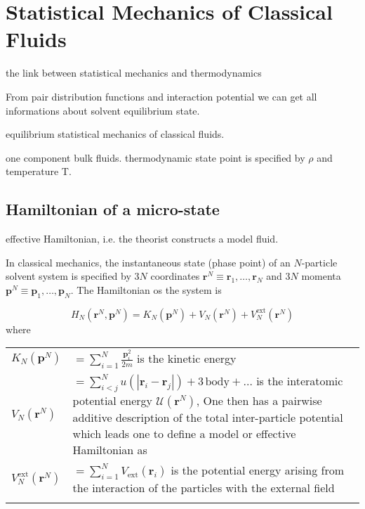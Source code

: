 
\chapter{Statistical Mechanics of Classical Fluids \label{chpt:statistical-mechanics}}

the link between statistical mechanics and thermodynamics

From pair distribution functions and interaction potential we can
get all informations about solvent equilibrium state.

equilibrium statistical mechanics of classical fluids.

one component bulk fluids. thermodynamic state point is specified
by $\rho$ and temperature T. 


\section{Hamiltonian of a micro-state}

effective Hamiltonian, i.e. the theorist constructs a model fluid. 

In classical mechanics, the instantaneous state (phase point) of an
$N$-particle solvent system is specified by $3N$ coordinates $\mathbf{r}^{N}\equiv\mathbf{r}_{1},\ldots,\mathbf{r}_{N}$
and $3N$ momenta $\mathbf{p}^{N}\equiv\mathbf{p}_{1},\ldots,\mathbf{p}_{N}$.
The Hamiltonian os the system is

\begin{equation}
H_{N}(\mathbf{r}^{N},\mathbf{p}^{N})=K_{N}(\mathbf{p}^{N})+V_{N}(\mathbf{r}^{N})+V_{N}^{\mathrm{ext}}(\mathbf{r}^{N})
\end{equation}
where

\begin{tabular}{ll}
$K_{N}(\mathbf{p}^{N})$ & $={\displaystyle \sum_{i=1}^{N}\frac{\mathbf{p}_{i}^{2}}{2m}}$ is
the kinetic energy \tabularnewline
$V_{N}(\mathbf{r}^{N})$ & $={\displaystyle \sum_{i<j}^{N}u(\left|\mathbf{r}_{i}-\mathbf{r}_{j}\right|)+3\,\mathrm{body}+\ldots}$
is the interatomic potential energy $\mathcal{U}(\mathbf{r}^{N})$,
One then has a pairwise additive description of the total inter-particle
potential which leads one to define a model or effective Hamiltonian
as\tabularnewline
$V_{N}^{\mathrm{ext}}(\mathbf{r}^{N})$ & $={\displaystyle \sum_{i=1}^{N}}V_{\mathrm{ext}}(\mathbf{r}_{i})$
is the potential energy arising from the interaction of the particles
with the external field\tabularnewline
 & \tabularnewline
\end{tabular}

